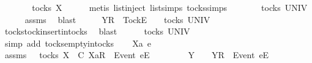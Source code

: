 \ \ \isamarkupfalse%
\ \isamarkupfalse%
\ {\isachardoublequoteopen}{\isasymrho}\ {\isasymin}\ tocks\ X{\isachardoublequoteclose}\isanewline
\ \ \ \ \isamarkupfalse%
\ {\isacharparenleft}metis\ list{\isachardot}inject\ list{\isachardot}simps{\isacharparenleft}{}{\isacharparenright}\ tocks{\isachardot}simps{\isacharparenright}\isanewline
\ \ \isamarkupfalse%
\ \isamarkupfalse%
\ {\isachardoublequoteopen}{\isasymsigma}\ {\isasymin}\ tocks\ UNIV{\isachardoublequoteclose}\isanewline
\ \ \ \ \isamarkupfalse%
\ assms{\isacharparenleft}{}{\isacharparenright}\ \isamarkupfalse%
\ blast\isanewline
\ \ \isamarkupfalse%
\ \isamarkupfalse%
\ {\isachardoublequoteopen}{\isacharbrackleft}Y{\isacharbrackright}\isactrlsub R\ {\isacharhash}\ {\isacharbrackleft}Tock{\isacharbrackright}\isactrlsub E\ {\isacharhash}\ {\isasymsigma}\ {\isasymin}\ tocks\ UNIV{\isachardoublequoteclose}\isanewline
\ \ \ \ \isamarkupfalse%
\ tocks{\isachardot}tock{\isacharunderscore}insert{\isacharunderscore}in{\isacharunderscore}tocks\ \isamarkupfalse%
\ blast\isanewline
{}\isamarkupfalse%
\isanewline
\ \ \isamarkupfalse%
\ {\isachardoublequoteopen}{\isacharbrackleft}{\isacharbrackright}\ {\isasymin}\ tocks\ UNIV{\isachardoublequoteclose}\isanewline
\ \ \ \ \isamarkupfalse%
\ {\isacharparenleft}simp\ add{\isacharcolon}\ tocks{\isachardot}empty{\isacharunderscore}in{\isacharunderscore}tocks{\isacharparenright}\isanewline
{}\isamarkupfalse%
\isanewline
\ \ \isamarkupfalse%
\ Xa\ e\ {\isasymrho}\ {\isasymsigma}\isanewline
\ \ \isamarkupfalse%
\ assms{\isacharcolon}\ {\isachardoublequoteopen}{\isasymrho}\ {\isasymin}\ tocks\ X{\isachardoublequoteclose}\ {\isachardoublequoteopen}{\isasymrho}\ {\isasymsubseteq}\isactrlsub C\ {\isacharbrackleft}Xa{\isacharbrackright}\isactrlsub R\ {\isacharhash}\ {\isacharbrackleft}Event\ e{\isacharbrackright}\isactrlsub E\ {\isacharhash}\ {\isasymsigma}{\isachardoublequoteclose}\isanewline
\ \ \isamarkupfalse%
\ \isamarkupfalse%
\ {\isasymrho}{\isacharprime}\ Y\ \ {\isachardoublequoteopen}{\isasymrho}\ {\isacharequal}\ {\isacharbrackleft}Y{\isacharbrackright}\isactrlsub R\ {\isacharhash}\ {\isacharbrackleft}Event\ e{\isacharbrackright}\isactrlsub E\ {\isacharhash}\ {\isasymrho}{\isacharprime}{\isachardoublequoteclose}\isanewline
